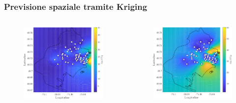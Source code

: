 \begin{frame}
	\frametitle{Previsione spaziale tramite Kriging}
	\centering
	
	\begin{columns}
		\begin{column}{0.33\linewidth}
			\centering
			\begin{figure}
				\includegraphics[width=\textwidth]{../Tesi/Immagini/4. Caso di studio/Kriging/Mappa volume, 1}
			\end{figure}
		\end{column}
		\begin{column}{0.33\linewidth}
			\centering
			\begin{figure}
				\includegraphics[width=\textwidth]{../Tesi/Immagini/4. Caso di studio/Kriging/Mappa volume, 2}

\end{figure}
\end{column}
\end{columns}
\end{frame}
